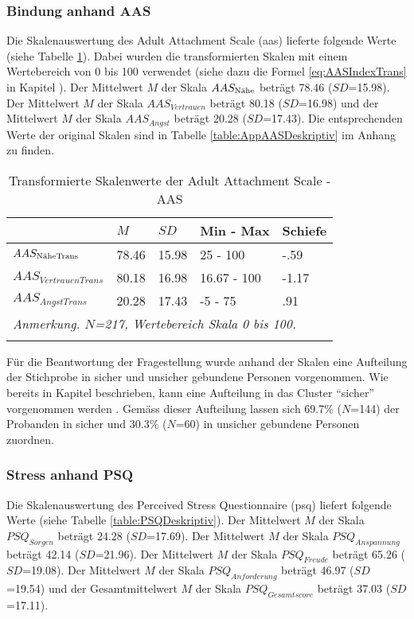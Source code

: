 \subsubsection{Bindung anhand AAS}
Die Skalenauswertung des Adult Attachment Scale (\acrshort{aas}) lieferte folgende Werte (siehe Tabelle \ref{table:AASDeskriptivTrans}). Dabei wurden die transformierten Skalen mit einem Wertebereich von 0 bis 100 verwendet (siehe dazu die Formel \ref{eq:AASIndexTrans} in Kapitel ). Der Mittelwert $M$ der Skala $AAS_{\textnormal{Nähe}}$ beträgt 78.46 ($SD$=15.98). Der Mittelwert $M$ der Skala $AAS_{Vertrauen}$ beträgt 80.18 ($SD$=16.98) und der Mittelwert  $M$ der Skala $AAS_{Angst}$ beträgt 20.28 ($SD$=17.43). Die entsprechenden Werte der original Skalen sind in Tabelle \ref{table:AppAASDeskriptiv} im Anhang zu finden.

\begin{table}%
\begin{tabular}{m{7em} m{3em}  m{3em}  m{5em} m{3em}} 
  \hline
  & $M$ & $SD$ & Min - Max & Schiefe\\
  \hline
  $AAS_{\textit{\textnormal{NäheTrans}}}$ & 78.46 & 15.98 & 25 - 100 & -.59\\
  $AAS_{VertrauenTrans}$ & 80.18 & 16.98 & 16.67 - 100 & -1.17\\
  $AAS_{AngstTrans}$ & 20.28 & 17.43 & -5 - 75 & .91 \\
  \hline
  \multicolumn{5}{l}{\textit{Anmerkung. $N$=217, Wertebereich Skala 0 bis 100.}}\\
  &&&&\\
\end{tabular}
\caption{Transformierte Skalenwerte der Adult Attachment Scale - AAS}
\label{table:AASDeskriptivTrans}
\end{table}

Für die Beantwortung der Fragestellung wurde anhand der Skalen eine Aufteilung der Stichprobe in sicher und unsicher gebundene Personen vorgenommen. Wie bereits in Kapitel  beschrieben, kann eine Aufteilung in das Cluster \enquote{sicher} vorgenommen werden \cite{Schuetzmann2004}. Gemäss dieser Aufteilung lassen sich 69.7\% ($N$=144) der Probanden in sicher und 30.3\% ($N$=60) in unsicher gebundene Personen zuordnen. 

\subsubsection{Stress anhand PSQ}
Die Skalenauswertung des Perceived Stress Questionnaire (\acrshort{psq}) liefert folgende Werte (siehe Tabelle \ref{table:PSQDeskriptiv}). Der Mittelwert $M$ der Skala $PSQ_{Sorgen}$ beträgt 24.28 ($SD$=17.69). Der Mittelwert $M$ der Skala $PSQ_{Anspannung}$ beträgt 42.14 ($SD$=21.96). Der Mittelwert $M$ der Skala $PSQ_{Freude}$ beträgt 65.26 ($SD$=19.08). Der Mittelwert $M$ der Skala $PSQ_{Anforderung}$ beträgt 46.97 ($SD$=19.54) und der Gesamtmittelwert $M$ der Skala $PSQ_{Gesamtscore}$ beträgt 37.03 ($SD$=17.11).

